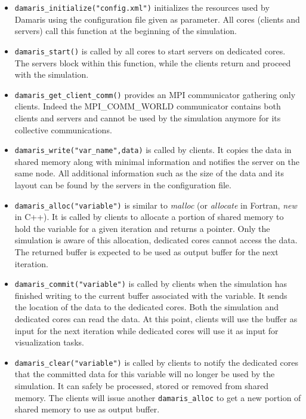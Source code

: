 \begin{itemize}
	\item \texttt{damaris\_initialize("config.xml")}
	initializes the resources used by Damaris using the configuration file given as parameter. 
	All cores (clients and servers) call this function at the beginning of the simulation.
	
	\item \texttt{damaris\_start()} is called by all cores to start servers on dedicated cores. 
	The servers block within this function, while the clients return and proceed with the simulation.
	
	\item \texttt{damaris\_get\_client\_comm()} provides an MPI communicator gathering
	only clients. Indeed the MPI\_COMM\_WORLD communicator contains both clients and servers
	 and cannot be used by the simulation anymore for its collective communications.
	
	\item \texttt{damaris\_write("var\_name",data)} is called by clients. It copies the data in shared 
	memory along with minimal information and notifies the server on the same node. 
	All additional information such as the size of the data and its layout 
	can be found by the servers in the configuration file.
	
	\item \texttt{damaris\_alloc("variable")} is similar to \emph{malloc} (or 
	\emph{allocate} in Fortran, \emph{new} in C++). It is called by clients to allocate a portion of 
	shared memory to hold the variable for a given iteration and returns a 
	pointer. Only the simulation is aware of this allocation, dedicated cores
	cannot access the data. The returned buffer is expected to be used as output buffer for the
	next iteration.
	
	\item \texttt{damaris\_commit("variable")} is called by clients when the simulation has
	finished writing to the current buffer associated with the variable. It 
	sends the location of the data to the dedicated cores. Both the simulation 
	and dedicated cores can read the data. At this point, clients will use the buffer as input
	for the next iteration while dedicated cores will use it as input for visualization tasks.
	
	\item \texttt{damaris\_clear("variable")} is called by clients to notify the dedicated cores that the 
	committed data for this variable will no longer be used by the simulation. 
	It can safely be processed, stored or removed from shared memory. The clients will issue another
	\texttt{damaris\_alloc} to get a new portion of shared memory to use as output buffer.
	

\end{itemize}
